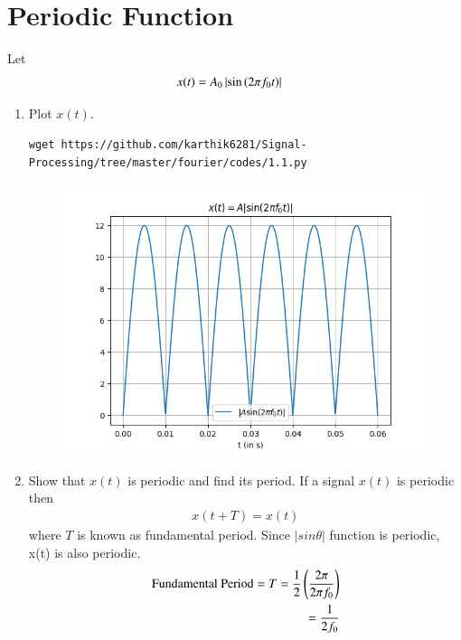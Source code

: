 \documentclass[journal,12pt,twocolumn]{IEEEtran}
\renewcommand\thesection{\arabic{section}}
\begin{document}
\section{Periodic Function}
Let 
\begin{align}
	x(t) &= A_0\left\vert\sin\left(2\pi f_0 t\right)\right\vert
	\label{eq:10-orig-diff-def}
\end{align}
\begin{enumerate}[label=\thesection.\arabic*
,ref=\thesection.\theenumi]
\item Plot $x(t)$.\\
\solution 
\begin{lstlisting}
wget https://github.com/karthik6281/Signal-Processing/tree/master/fourier/codes/1.1.py

\end{lstlisting}
\begin{figure}[!ht]
	\centering
	\includegraphics[width=\columnwidth]{./figs/1.1}
	\caption{}
\end{figure}
\item Show that $x(t)$ is periodic and find its period.
\solution 
    If a signal $x(t)$ is periodic then
    \begin{align}
    x(t+T)=x(t)
    \end{align}
    where $T$ is known as fundamental period.
    \indent Since $|sin\theta|$ function is periodic, x(t) is also periodic.
    \begin{align}
\text{Fundamental Period}=T=\frac{1}{2}\left(\frac{2 \pi}{2 \pi f_0}\right)\\
\label{eq:ftp}
=\frac{1}{2f_0}
    \end{align}
\end{enumerate}
\end{document}
